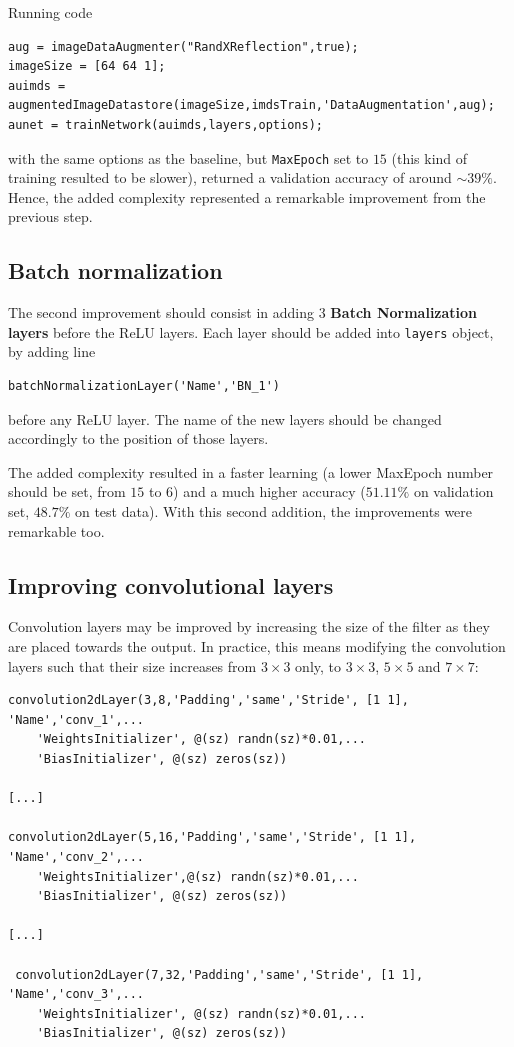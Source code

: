 \documentclass[a4paper, 11pt]{article} %
\begin{document}
Running code 

\begin{lstlisting}
aug = imageDataAugmenter("RandXReflection",true);
imageSize = [64 64 1];
auimds = augmentedImageDatastore(imageSize,imdsTrain,'DataAugmentation',aug);
aunet = trainNetwork(auimds,layers,options);
\end{lstlisting}

with the same options as the baseline, but \texttt{MaxEpoch} set to $15$ (this kind of training resulted to be slower), returned a validation accuracy of around $\sim 39\%$. Hence, the added complexity represented a remarkable improvement from the previous step.

\subsection{Batch normalization}

The second improvement should consist in adding $3$ \textbf{Batch Normalization layers} before the ReLU layers. Each layer should be added into \texttt{layers} object, by adding line

\begin{lstlisting}
batchNormalizationLayer('Name','BN_1')
\end{lstlisting} 

before any ReLU layer. The name of the new layers should be changed accordingly to the position of those layers.

The added complexity resulted in a faster learning (a lower MaxEpoch number should be set, from $15$ to $6$) and a much higher accuracy ($51.11\%$ on validation set, $48.7\%$ on test data). With this second addition, the improvements were remarkable too.

\subsection{Improving convolutional layers}

Convolution layers may be improved by increasing the size of the filter as they are placed towards the output. In practice, this means modifying the convolution layers such that their size increases from $3\times 3$ only, to $3 \times 3$, $5\times 5$ and $7 \times 7$:

\begin{lstlisting}
convolution2dLayer(3,8,'Padding','same','Stride', [1 1], 'Name','conv_1',...
    'WeightsInitializer', @(sz) randn(sz)*0.01,...
    'BiasInitializer', @(sz) zeros(sz))

[...]

convolution2dLayer(5,16,'Padding','same','Stride', [1 1], 'Name','conv_2',...
    'WeightsInitializer',@(sz) randn(sz)*0.01,...
    'BiasInitializer', @(sz) zeros(sz))

[...]

 convolution2dLayer(7,32,'Padding','same','Stride', [1 1], 'Name','conv_3',...
    'WeightsInitializer', @(sz) randn(sz)*0.01,...
    'BiasInitializer', @(sz) zeros(sz))
\end{lstlisting}
\end{document}
